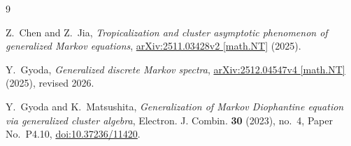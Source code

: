\documentclass[11pt]{amsart}
\begin{document}
\begin{thebibliography}{9}

Z.~Chen and Z.~Jia,
\emph{Tropicalization and cluster asymptotic phenomenon of generalized Markov
equations},
\href{https://arxiv.org/abs/2511.03428v2}
{arXiv:2511.03428v2 [math.NT]} (2025).

Y.~Gyoda,
\emph{Generalized discrete Markov spectra},
\href{https://arxiv.org/abs/2512.04547v4}
{arXiv:2512.04547v4 [math.NT]} (2025), revised 2026.

Y.~Gyoda and K.~Matsushita,
\emph{Generalization of Markov Diophantine equation via generalized cluster
algebra},
Electron. J. Combin. \textbf{30} (2023), no.~4, Paper No.~P4.10,
\href{https://doi.org/10.37236/11420}{doi:10.37236/11420}.

\end{thebibliography}
\end{document}

